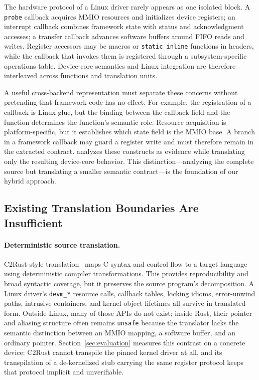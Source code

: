 The hardware protocol of a Linux driver rarely appears as one isolated block. A \texttt{probe} callback acquires MMIO resources and initializes device registers; an interrupt callback combines framework state with status and acknowledgment accesses; a transfer callback advances software buffers around FIFO reads and writes. Register accessors may be macros or \texttt{static inline} functions in headers, while the callback that invokes them is registered through a subsystem-specific operations table. Device-core semantics and Linux integration are therefore interleaved across functions and translation units.

A useful cross-backend representation must separate these concerns without pretending that framework code has no effect. For example, the registration of a callback is Linux glue, but the binding between the callback field and the function determines the function's semantic role. Resource acquisition is platform-specific, but it establishes which state field is the MMIO base. A branch in a framework callback may guard a register write and must therefore remain in the extracted contract. \reharness{} analyzes these constructs as evidence while translating only the resulting device-core behavior. This distinction---analyzing the complete source but translating a smaller semantic contract---is the foundation of our hybrid approach.

\subsection{Existing Translation Boundaries Are Insufficient}

\paragraph{Deterministic source translation.} C2Rust-style translation~\cite{emrath2021c2rust} maps C syntax and control flow to a target language using deterministic compiler transformations. This provides reproducibility and broad syntactic coverage, but it preserves the source program's decomposition. A Linux driver's \texttt{devm\_*} resource calls, callback tables, locking idioms, error-unwind paths, intrusive containers, and kernel object lifetimes all survive in translated form. Outside Linux, many of those APIs do not exist; inside Rust, their pointer and aliasing structure often remains \texttt{unsafe} because the translator lacks the semantic distinction between an MMIO mapping, a software buffer, and an ordinary pointer. Section~\ref{sec:evaluation} measures this contrast on a concrete device: C2Rust cannot transpile the pinned kernel driver at all, and its transpilation of a de-kernelized stub carrying the same register protocol keeps that protocol implicit and unverifiable.

